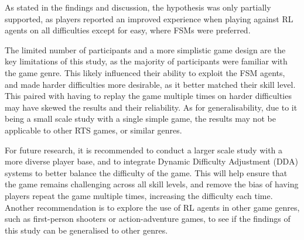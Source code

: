 \documentclass[conference]{IEEEtran}
\begin{document}
As stated in the findings and discussion, the hypothesis was only partially supported, as players reported an improved experience when playing against RL agents
on all difficulties except for easy, where FSMs were preferred.

The limited number of participants and a more simplistic game design are the key limitations of this study, as the majority of participants were familiar with the game genre.
This likely influenced their ability to exploit the FSM agents, and made harder difficulties more desirable, as it better matched their skill level. This paired with having to replay the game multiple times on
harder difficulties may have skewed the results and their reliability. As for generalisability, due to it being a small scale study with a single simple game, the results may not be applicable to other RTS games,
or similar genres.

For future research, it is recommended to conduct a larger scale study with a more diverse player base, and to integrate Dynamic Difficulty Adjustment (DDA) systems to better balance the difficulty of the game.
This will help ensure that the game remains challenging across all skill levels, and remove the bias of having players repeat the game multiple times, increasing the difficulty each time.
Another recommendation is to explore the use of RL agents in other game genres, such as first-person shooters or action-adventure games, to see if the findings of this study can be generalised to other genres.



\end{document}
